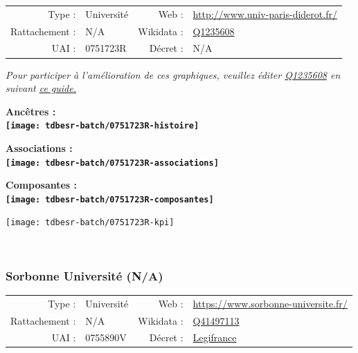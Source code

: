 \documentclass[12pt,french,]{article}
\begin{document}
\begin{tabular*}{\textwidth}{rp{5cm}rl}  
\hline  
Type : & Université & Web : &\href{http://www.univ-paris-diderot.fr/}{http://www.univ-paris-diderot.fr/} \\  
Rattachement : & N/A & Wikidata : & \href{https://www.wikidata.org/entity/Q1235608}{Q1235608} \\  
UAI : & 0751723R & Décret : & N/A \\  
\hline  
\end{tabular*}

\textit{\scriptsize Pour participer à l'amélioration de ces graphiques, veuillez éditer  \href{https://www.wikidata.org/entity/Q1235608}{Q1235608}  en suivant \href{https://github.com/cpesr/wikidataESR/blob/master/Rmd/wikidataESR.md}{ce guide.}}

\vspace{1cm}  
\begin{minipage}[b]{0.50\textwidth}\begin{center} \bf Ancêtres : \\  
\texttt{[image: tdbesr-batch/0751723R-histoire]} \end{center}\end{minipage}\begin{minipage}[b]{0.50\textwidth}\begin{center} \bf Associations : \\  
\texttt{[image: tdbesr-batch/0751723R-associations]} \end{center}\end{minipage}

\hrulefill

\begin{center} \bf Composantes : \\  
\texttt{[image: tdbesr-batch/0751723R-composantes]} \end{center}

\begin{center}\texttt{[image: tdbesr-batch/0751723R-kpi]} \end{center}\checkoddpage

\ifoddpage \fi ~\newpage  

\hypertarget{sorbonne-universituxe9-na}{%
\subsubsection{Sorbonne Université
(N/A)}\label{sorbonne-universituxe9-na}}

\begin{tabular*}{\textwidth}{rp{5cm}rl}  
\hline  
Type : & Université & Web : &\href{https://www.sorbonne-universite.fr/}{https://www.sorbonne-universite.fr/} \\  
Rattachement : & N/A & Wikidata : & \href{https://www.wikidata.org/entity/Q41497113}{Q41497113} \\  
UAI : & 0755890V & Décret : & \href{https://www.legifrance.gouv.fr/affichTexte.do?cidTexte=JORFTEXT000034455357&categorieLien=id}{Legifrance} \\  
\hline  
\end{tabular*}
\end{document}
